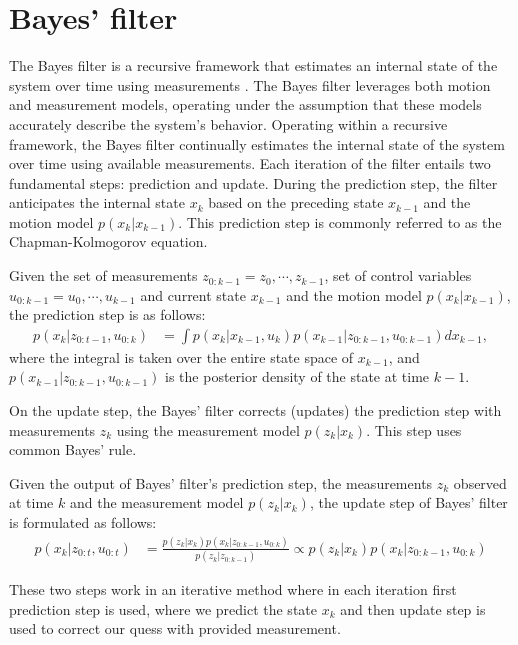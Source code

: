 \section{Bayes' filter}
The Bayes filter is a recursive framework that estimates an internal state of the system over time using measurements
. The Bayes filter leverages both motion and measurement models, operating under the assumption that these models
accurately describe the system's behavior. Operating within a recursive framework, the Bayes filter continually
estimates the internal state of the system over time using available measurements. Each iteration of the filter
entails two fundamental steps: prediction and update. During the prediction step, the filter anticipates the internal
state $x_k$ based on the preceding state $x_{k-1}$ and the motion model $p(x_k|x_{k-1})$. This prediction step is
commonly referred to as the Chapman-Kolmogorov equation.
\begin{theorem}
    Given the set of measurements $z_{0:k-1} = {z_0,\cdots, z_{k-1}}$, set of control variables $u_{0:k-1} = {u_0,\cdots, u_{k-1}}$ and current state $x_{k-1}$ and the motion model $p(x_k|x_{k-1})$, the prediction step is as follows:
    \begin{align}
        p(x_k|z_{0:t-1}, u_{0:k}) &= \int p(x_k|x_{k-1}, u_k) p(x_{k-1}|z_{0:k-1}, u_{0:k-1}) dx_{k-1},
        \label{eq:chapman_kolmogorov_predict}
    \end{align}
    where the integral is taken over the entire state space of $x_{k-1}$, and $p(x_{k-1}|z_{0:k-1}, u_{0:k-1})$ is
    the posterior density of the state at time $k-1$.
\end{theorem}
On the update step, the Bayes' filter corrects (updates) the prediction step with measurements $z_k$ using the
measurement model $p(z_k|x_k)$. This step uses common Bayes' rule.
\begin{theorem}
    Given the output of Bayes' filter's prediction step, the measurements $z_k$ observed at time $k$ and the
    measurement model $p(z_k|x_k)$, the update step of Bayes' filter is formulated as follows:
    \begin{align}
        \label{eq:bayes_update}
        p(x_k|z_{0:t}, u_{0:t}) &= \frac{p(z_k|x_k) p(x_k|z_{0:k-1},u_{0:k})}{p(z_k|z_{0:k-1})} \propto p(z_k|x_k) p
        (x_k|z_{0:k-1},u_{0:k})
    \end{align}
\end{theorem}
These two steps work in an iterative method where in each iteration first prediction step is used, where we predict
the state $x_k$ and then update step is used to correct our quess with provided measurement.
